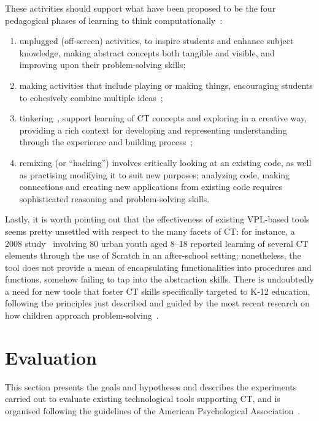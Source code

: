These activities should support what have been proposed to be the four pedagogical phases of learning to think computationally~\cite{Namukasa:2015wj}:
\begin{enumerate}
  \item unplugged (off-screen) activities, to inspire students and enhance subject knowledge, making abstract concepts both tangible and visible, and improving upon their problem-solving skills;
  \item making activities that include playing or making things, encouraging students to cohesively combine multiple ideas~\cite{WilkersonJerde:2014ve};
  \item tinkering~\cite{Bers:2014fk}, support learning of \ac{CT} concepts and exploring in a creative way, providing a rich context for developing and representing understanding through the experience and building process~\cite{Papert:1980uh};
  \item remixing (or ``hacking'') involves critically looking at an existing code, as well as practising modifying it to suit new purposes; analyzing code, making connections and creating new applications from existing code requires sophisticated reasoning and problem-solving skills.
\end{enumerate}

Lastly, it is worth pointing out that the effectiveness of existing \ac{VPL}-based tools seems pretty unsettled with respect to the many facets of \ac{CT}: for instance, a 2008 study~\cite{Maloney:2008jt} involving 80 urban youth aged 8--18 reported learning of several \ac{CT} elements through the use of Scratch in an after-school setting; nonetheless, the tool does not provide a mean of encapsulating functionalities into procedures and functions, somehow failing to tap into the abstraction skills. There is undoubtedly a need for new tools that foster \ac{CT} skills specifically targeted to K-12 education, following the principles just described and guided by the most recent research on how children approach problem-solving~\cite{Chen:2007hc,Pane:2001jo}.

\section{Evaluation}
This section presents the goals and hypotheses and describes the ex\-per\-i\-ments car\-ried out to e\-val\-u\-ate ex\-ist\-ing tech\-no\-log\-i\-cal tools sup\-port\-ing \ac{CT}, and is or\-gan\-ised fol\-low\-ing the guide\-lines of the A\-mer\-i\-can Psychological Association~\cite{Wohlin:2000:ESE:330775}.

